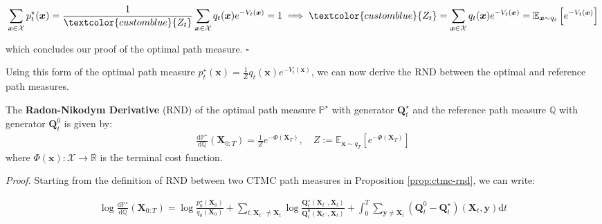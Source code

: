 \documentclass{article}
\newcommand{\bluetext}[1]{\textcolor{customblue}{#1}}
\begin{document}
\begin{small}
\begin{align}
    \sum_{\boldsymbol{x}\in \mathcal{X}}p^\star_t(\boldsymbol{x})=\frac{1}{\bluetext{Z_t}}\sum_{\boldsymbol{x}\in \mathcal{X}}q_t(\boldsymbol{x})e^{-V_t(\boldsymbol{x})}=1\implies \bluetext{Z_t}=\sum_{\boldsymbol{x}\in \mathcal{X}}q_t(\boldsymbol{x})e^{-V_t(\boldsymbol{x})}= \mathbb{E}_{\boldsymbol{x}\sim q_t}\left[e^{-V_t(\boldsymbol{x})}\right]
\end{align}
\end{small}
which concludes our proof of the optimal path measure. \hfill $\square$

Using this form of the optimal path measure $p^\star_t(\boldsymbol{x})=\frac{1}{Z}q_t(\boldsymbol{x})e^{-V_t(\boldsymbol{x})}$, we can now derive the RND between the optimal and reference path measures.

\begin{proposition}\label{prop:ctmc-rnd-optimal}
    The \textbf{Radon-Nikodym Derivative} (RND) of the optimal path measure $\mathbb{P}^\star$ with generator $\boldsymbol{Q}^\star_t$ and the reference path measure $\mathbb{Q}$ with generator $\boldsymbol{Q}^0_t$ is given by:
    \begin{align}
        \frac{\mathrm{d}\mathbb{P}^\star}{\mathrm{d}\mathbb{Q}}(\boldsymbol{X}_{0:T})=\frac{1}{Z}e^{-\Phi(\boldsymbol{X}_T)}, \quad Z:=\mathbb{E}_{\boldsymbol{x}\sim q_T}\left[e^{-\Phi(\boldsymbol{X}_T)}\right]\tag{Optimal RND}\label{eq:soc-optimal-rnd}
    \end{align}
    where $\Phi(\boldsymbol{x}):\mathcal{X}\to \mathbb{R}$ is the terminal cost function.
\end{proposition}

\textit{Proof.} Starting from the definition of RND between two CTMC path measures in Proposition \ref{prop:ctmc-rnd}, we can write:
\begin{small}
\begin{align}
    \log \frac{\mathrm{d}\mathbb{P}^\star}{\mathrm{d}\mathbb{Q}}(\boldsymbol{X}_{0:T})=\log \frac{p_0^\star(\boldsymbol{X}_0)}{q_0(\boldsymbol{X}_0)}+\sum_{t:\boldsymbol{X}_{t^-}\neq \boldsymbol{X}_t}\log \frac{\boldsymbol{Q}_t^\star(\boldsymbol{X}_{t^-}, \boldsymbol{X}_t)}{\boldsymbol{Q}^0_t(\boldsymbol{X}_{t^-}, \boldsymbol{X}_t)}+\int_0^T\sum_{\boldsymbol{y}\neq\boldsymbol{X}_t}(\boldsymbol{Q}^0_t-\boldsymbol{Q}^\star_t)(\boldsymbol{X}_t,\boldsymbol{y})\mathrm{d}t
\end{align}
\end{small}
\end{document}
